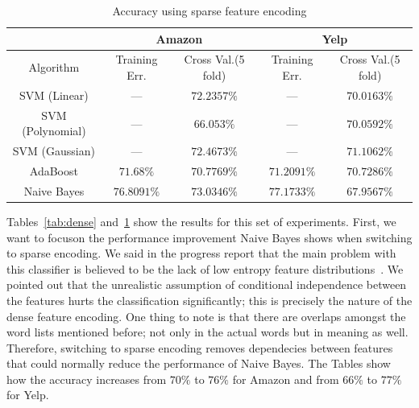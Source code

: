 \documentclass[letterpaper]{article}
\begin{document}
\begin{table}[ht]
\centering
\begin{tabular}{c | c c | c c}
 & \multicolumn{2}{|c|}{Amazon} & \multicolumn{2}{|c}{Yelp} \\
\hline
Algorithm & Training Err. & Cross Val.(5 fold) & Training Err. & Cross Val.(5 fold)\\
\hline
SVM (Linear) 		& --- & $72.2357\%$ 		& --- & $70.0163\%$\\
SVM (Polynomial) 	& --- & $66.053\%$ 		& --- & $70.0592\%$\\
SVM (Gaussian) 		& --- & $72.4673\%$ 		& --- & $71.1062\%$\\
AdaBoost 			& $71.68\%$   & $70.7769\%$ & $71.2091\%$ & $70.7286\%$\\ 
Naive Bayes 		& $76.8091\%$ & $73.0346\%$ & $77.1733\%$ & $67.9567\%$\\ 
\end{tabular}
\caption{Accuracy using sparse feature encoding}
\label{tab:sparse}
\end{table}

Tables~\ref{tab:dense} and~\ref{tab:sparse} show the results for this
set of experiments. First, we want to focuson the performance
improvement Naive Bayes shows when switching to sparse encoding. We
said in the progress report that the main problem with this classifier
is believed to be the lack of low entropy feature
distributions~\cite{naivebayes}. We pointed out that the unrealistic
assumption of conditional independence between the features hurts the
classification significantly; this is precisely the nature of the
dense feature encoding. One thing to note is that there are overlaps
amongst the word lists mentioned before; not only in the actual words
but in meaning as well. Therefore, switching to sparse encoding
removes dependecies between features that could normally reduce the
performance of Naive Bayes. The Tables show how the accuracy increases
from $70\%$ to $76\%$ for Amazon and from $66\%$ to $77\%$ for Yelp.
\end{document}
